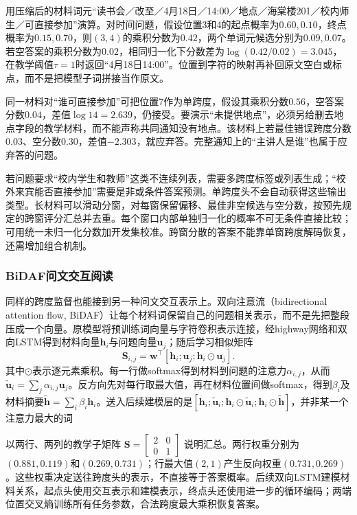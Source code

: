用压缩后的材料词元“读书会／改至／4月18日／14:00／地点／海棠楼201／校内师生／可直接参加”演算。对时间问题，假设位置3和4的起点概率为$0.60,0.10$，终点概率为$0.15,0.70$，则$(3,4)$的乘积分数为$0.42$，两个单词元候选分别为$0.09,0.07$。若空答案的乘积分数为$0.02$，相同归一化下分数差为$\log(0.42/0.02)=3.045$，在教学阈值$\tau=1$时返回“4月18日14:00”。位置到字符的映射再补回原文空白或标点，而不是把模型子词拼接当作原文。

同一材料对“谁可直接参加”可把位置7作为单跨度，假设其乘积分数$0.56$，空答案分数$0.04$，差值$\log14=2.639$，仍接受。要演示“未提供地点”，必须另给删去地点字段的教学材料，而不能声称共同通知没有地点。该材料上若最佳错误跨度分数$0.03$、空分数$0.30$，差值$-2.303$，就应弃答。完整通知上的“主讲人是谁”也属于应弃答的问题。

若问题要求“校内学生和教师”这类不连续列表，需要多跨度标签或列表生成；“校外来宾能否直接参加”需要是非或条件答案预测。单跨度头不会自动获得这些输出类型。长材料可以滑动分窗，对每窗保留偏移、最佳非空候选与空分数，按预先规定的跨窗评分汇总并去重。每个窗口内部单独归一化的概率不可无条件直接比较；可用统一未归一化分数加开发集校准。跨窗分散的答案不能靠单窗跨度解码恢复，还需增加组合机制。

\subsubsection{BiDAF问文交互阅读}
\label{sec:nlp-dialogue-bidaf}

同样的跨度监督也能接到另一种问文交互表示上。双向注意流（bidirectional attention flow, BiDAF）让每个材料词保留自己的问题相关表示，而不是先把整段压成一个向量。原模型将预训练词向量与字符卷积表示连接，经highway网络和双向LSTM得到材料向量$\bm{h}_i$与问题向量$\bm{u}_j$；随后学习相似矩阵
\begin{equation}
  \bm{S}_{i,j}=\bm{w}^{\top}
  [\bm{h}_i;\bm{u}_j;\bm{h}_i\odot\bm{u}_j].
  \label{eq:nlp-dialogue-bidaf}
\end{equation}
其中$\odot$表示逐元素乘积。每一行做softmax得到材料到问题的注意力$\alpha_{i,j}$，从而$\widetilde{\bm{u}}_i=\sum_j\alpha_{i,j}\bm{u}_j$。反方向先对每行取最大值，再在材料位置间做softmax，得到$\beta_i$及材料摘要$\widetilde{\bm{h}}=\sum_i\beta_i\bm{h}_i$。送入后续建模层的是$[\bm{h}_i;\widetilde{\bm{u}}_i;\bm{h}_i\odot\widetilde{\bm{u}}_i;\bm{h}_i\odot\widetilde{\bm{h}}]$，并非某一个注意力最大的词

以两行、两列的教学子矩阵
$\bm{S}=\left[\begin{smallmatrix}2&0\\0&1\end{smallmatrix}\right]$
说明汇总。两行权重分别为$(0.881,0.119)$和$(0.269,0.731)$；行最大值$(2,1)$产生反向权重$(0.731,0.269)$。这些权重决定送往跨度头的表示，不直接等于答案概率。后续双向LSTM建模材料关系，起点头使用交互表示和建模表示，终点头还使用进一步的循环编码；两端位置交叉熵训练所有任务参数，合法跨度最大乘积恢复答案。

